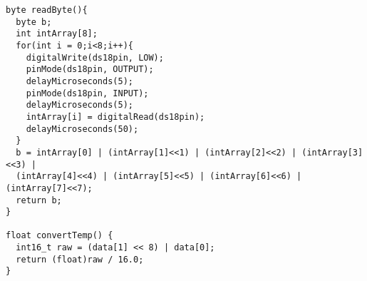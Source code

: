 \begin{lstlisting}
byte readByte(){
  byte b;
  int intArray[8];
  for(int i = 0;i<8;i++){
    digitalWrite(ds18pin, LOW);
    pinMode(ds18pin, OUTPUT);
    delayMicroseconds(5);
    pinMode(ds18pin, INPUT);
    delayMicroseconds(5);
    intArray[i] = digitalRead(ds18pin);
    delayMicroseconds(50);
  }
  b = intArray[0] | (intArray[1]<<1) | (intArray[2]<<2) | (intArray[3]<<3) | 
  (intArray[4]<<4) | (intArray[5]<<5) | (intArray[6]<<6) | (intArray[7]<<7);
  return b;
}

float convertTemp() {
  int16_t raw = (data[1] << 8) | data[0];
  return (float)raw / 16.0;
}

\end{lstlisting}